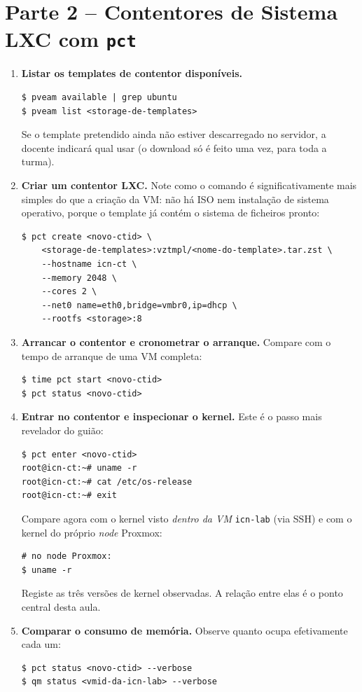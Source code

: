 \documentclass[11pt,a4paper]{article}
\begin{document}
\section{Parte 2 -- Contentores de Sistema LXC com \texttt{pct}}
\begin{enumerate}[label=\arabic*.,resume]

  \item \textbf{Listar os templates de contentor disponíveis.}
\begin{lstlisting}
$ pveam available | grep ubuntu
$ pveam list <storage-de-templates>
\end{lstlisting}
  Se o template pretendido ainda não estiver descarregado no servidor, a docente indicará qual usar (o download só é feito uma vez, para toda a turma).

  \item \textbf{Criar um contentor LXC.} Note como o comando é significativamente mais simples do que a criação da VM: não há ISO nem instalação de sistema operativo, porque o template já contém o sistema de ficheiros pronto:
\begin{lstlisting}
$ pct create <novo-ctid> \
    <storage-de-templates>:vztmpl/<nome-do-template>.tar.zst \
    --hostname icn-ct \
    --memory 2048 \
    --cores 2 \
    --net0 name=eth0,bridge=vmbr0,ip=dhcp \
    --rootfs <storage>:8
\end{lstlisting}

  \item \textbf{Arrancar o contentor e cronometrar o arranque.} Compare com o tempo de arranque de uma VM completa:
\begin{lstlisting}
$ time pct start <novo-ctid>
$ pct status <novo-ctid>
\end{lstlisting}

  \item \textbf{Entrar no contentor e inspecionar o kernel.} Este é o passo mais revelador do guião:
\begin{lstlisting}
$ pct enter <novo-ctid>
root@icn-ct:~# uname -r
root@icn-ct:~# cat /etc/os-release
root@icn-ct:~# exit
\end{lstlisting}
  Compare agora com o kernel visto \emph{dentro da VM} \texttt{icn-lab} (via SSH) e com o kernel do próprio \emph{node} Proxmox:
\begin{lstlisting}
# no node Proxmox:
$ uname -r
\end{lstlisting}
  Registe as três versões de kernel observadas. A relação entre elas é o ponto central desta aula.

  \item \textbf{Comparar o consumo de memória.} Observe quanto ocupa efetivamente cada um:
\begin{lstlisting}
$ pct status <novo-ctid> --verbose
$ qm status <vmid-da-icn-lab> --verbose
\end{lstlisting}

\end{enumerate}
\end{document}
